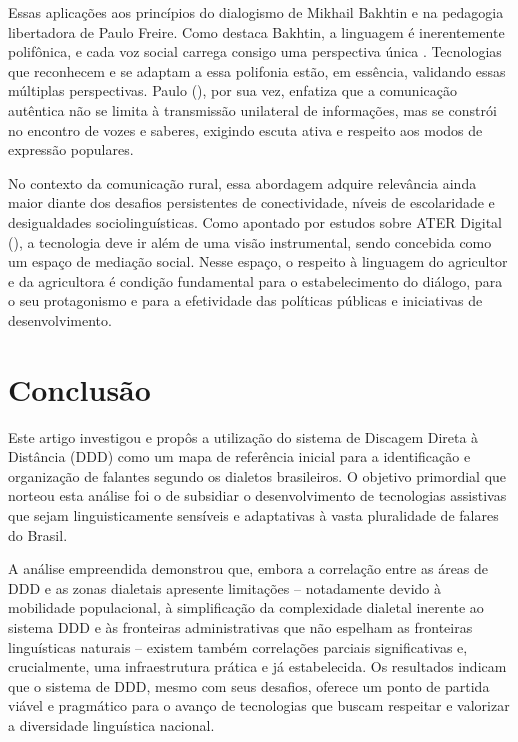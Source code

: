 Essas aplicações aos princípios do dialogismo de Mikhail Bakhtin e na pedagogia libertadora de Paulo Freire. Como destaca Bakhtin, a linguagem é inerentemente polifônica, e cada voz social carrega consigo uma perspectiva única \cite{bakhtin1997estetica}. Tecnologias que reconhecem e se adaptam a essa polifonia estão, em essência, validando essas múltiplas perspectivas. Paulo (\citeyear{freire2005pedagogia}), por sua vez, enfatiza que a comunicação autêntica não se limita à transmissão unilateral de informações, mas se constrói no encontro de vozes e saberes, exigindo escuta ativa e respeito aos modos de expressão populares.

No contexto da comunicação rural, essa abordagem adquire relevância ainda maior diante dos desafios persistentes de conectividade, níveis de escolaridade e desigualdades sociolinguísticas. Como apontado por estudos sobre ATER Digital (\cite{parra2022ater}), a tecnologia deve ir além de uma visão instrumental, sendo concebida como um espaço de mediação social. Nesse espaço, o respeito à linguagem do agricultor e da agricultora é condição fundamental para o estabelecimento do diálogo, para o seu protagonismo e para a efetividade das políticas públicas e iniciativas de desenvolvimento.


\section{Conclusão}


Este artigo investigou e propôs a utilização do sistema de Discagem Direta à Distância (DDD) como um mapa de referência inicial para a identificação e organização de falantes segundo os dialetos brasileiros. O objetivo primordial que norteou esta análise foi o de subsidiar o desenvolvimento de tecnologias assistivas que sejam linguisticamente sensíveis e adaptativas à vasta pluralidade de falares do Brasil.

A análise empreendida demonstrou que, embora a correlação entre as áreas de DDD e as zonas dialetais apresente limitações – notadamente devido à mobilidade populacional, à simplificação da complexidade dialetal inerente ao sistema DDD e às fronteiras administrativas que não espelham as fronteiras linguísticas naturais – existem também correlações parciais significativas e, crucialmente, uma infraestrutura prática e já estabelecida. Os resultados indicam que o sistema de DDD, mesmo com seus desafios, oferece um ponto de partida viável e pragmático para o avanço de tecnologias que buscam respeitar e valorizar a diversidade linguística nacional.


